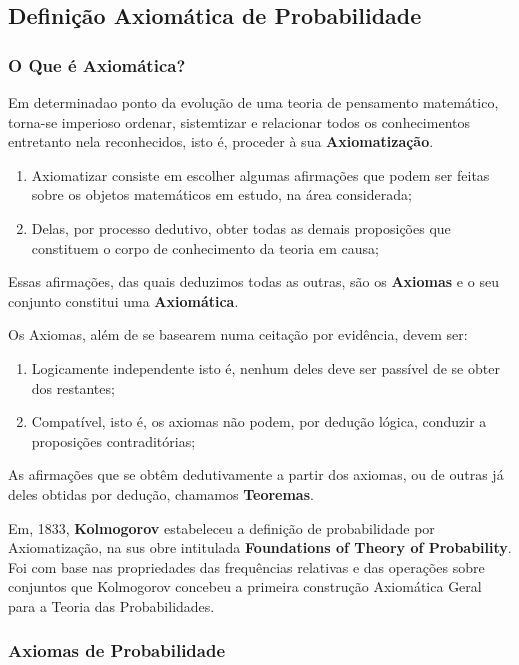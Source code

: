  \newpage
\subsection{Definição Axiomática de Probabilidade}
\subsubsection{O Que é Axiomática?}

\inic Em determinadao ponto da evolução de uma teoria de pensamento matemático, torna-se imperioso ordenar, sistemtizar e relacionar todos os conhecimentos entretanto nela reconhecidos, isto é, proceder à sua \textbf{Axiomatização}. 
 
\begin{enumerate}
\item Axiomatizar consiste em escolher algumas afirmações que podem ser feitas sobre os objetos matemáticos em estudo, na área considerada;
\item Delas, por processo dedutivo, obter todas as demais proposições que constituem o corpo de conhecimento da teoria em causa;
\end{enumerate} 

\inic Essas afirmações, das quais deduzimos todas as outras, são os \textbf{Axiomas} e o seu conjunto constitui uma \textbf{Axiomática}.\vskip0.3cm
 

\inic Os Axiomas, além de se basearem numa ceitação por evidência, devem ser:

\begin{enumerate}
    \item Logicamente independente isto é, nenhum deles deve ser passível de se obter dos restantes;
    \item Compatível, isto é, os axiomas não podem, por dedução lógica, conduzir a proposições contraditórias; 
\end{enumerate}
 
 \inic As afirmações que se obtêm dedutivamente a partir dos axiomas, ou de outras já deles obtidas por dedução, chamamos \textbf{Teoremas}.\vskip0.3cm
 
 \inic Em, 1833, \textbf{Kolmogorov} estabeleceu a definição de probabilidade por Axiomatização, na sus obre intitulada \textbf{Foundations of Theory of Probability}. Foi com base nas propriedades das frequências relativas e das operações sobre conjuntos que Kolmogorov concebeu a primeira construção Axiomática Geral para a Teoria das Probabilidades.\vskip0.3cm


\subsubsection{Axiomas de Probabilidade}

